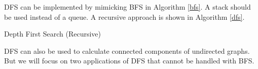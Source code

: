 DFS can be implemented by mimicking BFS in Algorithm \ref{bfs}. A stack should be used instead of a queue. A recursive approach is shown in Algorithm \ref{dfs}.
\begin{algorithm}[ht]
\caption{Depth First Search (Recursive)}\label{dfs}
\begin{algorithmic}[1]
\Input{}
\Output{}
\EndIf
\EndFor
\EndFunction
\end{algorithmic}
\end{algorithm}
DFS can also be used to calculate connected components of undirected graphs. But we will focus on two applications of DFS that cannot be handled with BFS.
